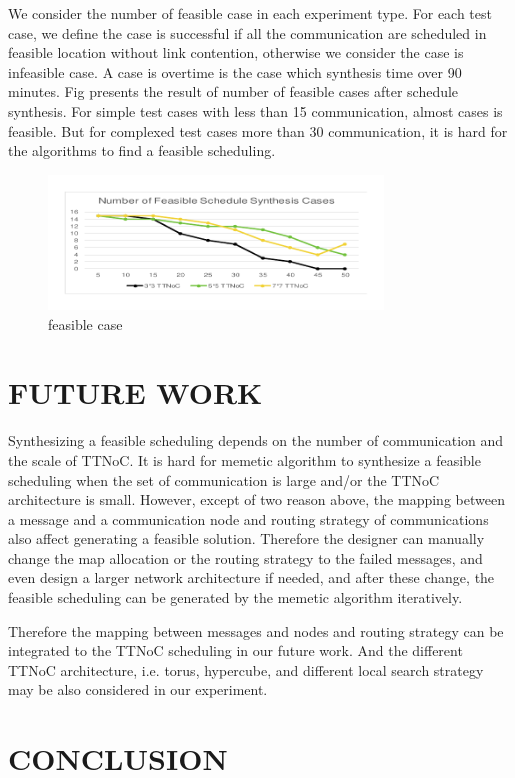\documentclass[conference]{IEEEtran}
\begin{document}
We consider the number of feasible  case in each experiment type. For each test case, we define the case is successful if all the communication are scheduled in feasible location without link contention, otherwise we consider the case is infeasible case. A case is overtime is the case which synthesis time over 90 minutes. Fig presents the result of number of feasible cases after schedule synthesis. For simple test cases with less than 15 communication, almost cases is feasible. But for complexed test cases more than 30 communication, it is hard for the algorithms to find a feasible scheduling.
\begin{figure}[!t]
	\centering
	\includegraphics[width=3.5in]{picture/feasible}
	\caption{feasible case}
	\label{feasible case}
\end{figure}

\section{FUTURE WORK}

Synthesizing a feasible scheduling depends on the number of communication and the scale of TTNoC. It is hard for memetic algorithm to synthesize a feasible scheduling when the set of communication is large and/or the TTNoC architecture is small. However, except of two reason above, the mapping between a message and a communication node and routing strategy of communications also affect generating a feasible solution. Therefore the designer can manually change the map allocation or the routing strategy to the failed messages, and even design a larger network architecture if needed, and after these change, the feasible scheduling can be generated by the memetic algorithm iteratively. 

Therefore the mapping between messages and nodes and routing strategy can be integrated to the TTNoC scheduling in our future work. And the different TTNoC architecture, i.e. torus, hypercube, and different local search strategy may be also considered in our experiment.

\section{CONCLUSION}
\end{document}
